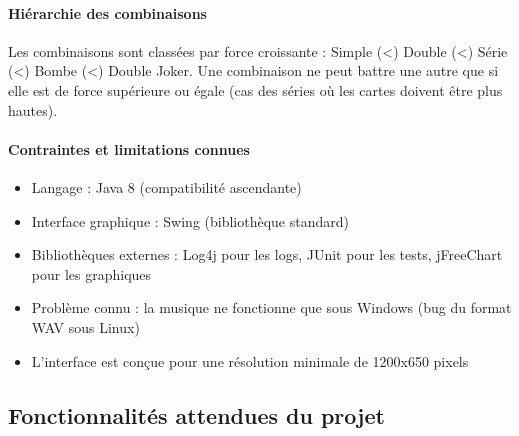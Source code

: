 \paragraph{Hiérarchie des combinaisons}
Les combinaisons sont classées par force croissante : Simple (<) Double (<) Série (<) Bombe (<) Double Joker. Une combinaison ne peut battre une autre que si elle est de force supérieure ou égale (cas des séries où les cartes doivent être plus hautes).

\paragraph{Contraintes et limitations connues}
\begin{itemize}
\item Langage : Java 8 (compatibilité ascendante)
\item Interface graphique : Swing (bibliothèque standard)
\item Bibliothèques externes : Log4j pour les logs, JUnit pour les tests, jFreeChart pour les graphiques
\item Problème connu : la musique ne fonctionne que sous Windows (bug du format WAV sous Linux)
\item L'interface est conçue pour une résolution minimale de 1200x650 pixels
\end{itemize}

\subsection{Fonctionnalités attendues du projet}
\label{sec:spec2}

